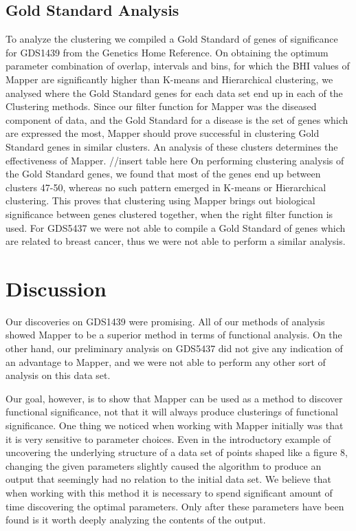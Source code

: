 \documentclass[preprint,10pt]{elsarticle}
\begin{document}
\subsection{Gold Standard Analysis}
	To analyze the clustering we compiled a Gold Standard of genes of significance for GDS1439 from the Genetics Home Reference. On obtaining the optimum parameter combination of overlap, intervals and bins, for which the BHI values of Mapper are significantly higher than K-means and Hierarchical clustering, we analysed where the Gold Standard genes for each data set end up in each of the Clustering methods. Since our filter function for Mapper was the diseased component of data, and the Gold Standard for a disease is the set of genes which are expressed the most, Mapper should prove successful in clustering Gold Standard genes in similar clusters. An analysis of these clusters determines the effectiveness of Mapper.
//insert table here
On performing clustering analysis of the Gold Standard genes, we found that most of the genes end up between clusters 47-50, whereas no such pattern emerged in K-means or Hierarchical clustering. This proves that clustering using Mapper brings out biological significance between genes clustered together, when the right filter function is used.
	For GDS5437 we were not able to compile a Gold Standard of genes which are related to breast cancer, thus we were not able to perform a similar analysis.



\section{Discussion}
Our discoveries on GDS1439 were promising. All of our methods of analysis showed Mapper to be a superior method in terms of functional analysis. On the other hand, our preliminary analysis on GDS5437 did not give any indication of an advantage to Mapper, and we were not able to perform any other sort of analysis on this data set. 

Our goal, however, is to show that Mapper can be used as a method to discover functional significance, not that it will always produce clusterings of functional significance. One thing we noticed when working with Mapper initially was that it is very sensitive to parameter choices. Even in the introductory example of uncovering the underlying structure of a data set of points shaped like a figure 8, changing the given parameters slightly caused the algorithm to produce an output that seemingly had no relation to the initial data set. We believe that when working with this method it is necessary to spend significant amount of time discovering the optimal parameters. Only after these parameters have been found is it worth deeply analyzing the contents of the output. 
\end{document}
